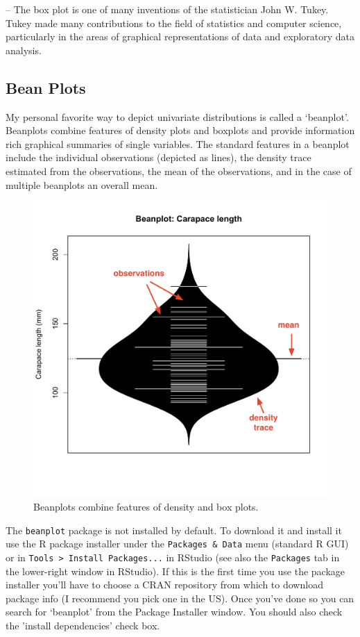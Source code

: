 -- The box plot is one of many inventions of the statistician John W.
Tukey. Tukey made many contributions to the field of statistics and
computer science, particularly in the areas of graphical representations
of data and exploratory data analysis.

\subsection{Bean Plots}

My personal favorite way to depict univariate distributions is called a
`beanplot'. Beanplots combine features of density plots and boxplots and
provide information rich graphical summaries of single variables. The
standard features in a beanplot include the individual observations
(depicted as lines), the density trace estimated from the observations,
the mean of the observations, and in the case of multiple beanplots an
overall mean.

\begin{figure}[htbp]
\centering
\includegraphics[width=0.5\columnwidth]{./figures/hands-on2/beanplot-labeled.pdf}
\caption{Beanplots combine features of density and box plots.}
\end{figure}

The \lstinline!beanplot! package is not installed by default. To
download it and install it use the R package installer under the
\lstinline!Packages & Data! menu (standard R GUI) or in
\lstinline!Tools > Install Packages...! in RStudio (see also the
\lstinline!Packages! tab in the lower-right window in RStudio). If this
is the first time you use the package installer you'll have to choose a
CRAN repository from which to download package info (I recommend you
pick one in the US). Once you've done so you can search for `beanplot'
from the Package Installer window. You should also check the 'install
dependencies' check box.


